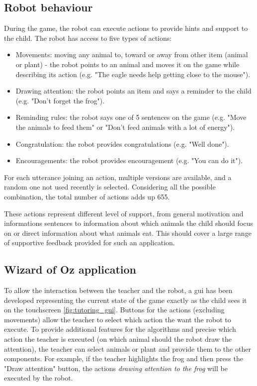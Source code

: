 \subsection{Robot behaviour}
 
During the game, the robot can execute actions to provide hints and support to the child. The robot has access to five types of actions:
\begin{itemize}
	\item Movements: moving any animal to, toward or away from other item (animal or plant) - the robot points to an animal and moves it on the game while describing its action (e.g. "The eagle needs help getting close to the mouse").
	\item Drawing attention: the robot points an item and says a reminder to the child (e.g. "Don't forget the frog").
	\item Reminding rules: the robot says one of 5 sentences on the game (e.g. "Move the animals to feed them" or "Don't feed animals with a lot of energy").
	\item Congratulation: the robot provides congratulations (e.g. "Well done").
	\item Encouragements: the robot provides encouragement (e.g. "You can do it").
\end{itemize}

For each utterance joining an action, multiple versions are available, and a random one not used recently is selected. Considering all the possible combination, the total number of  actions adds up 655.

These actions represent different level of support, from general motivation and informations sentences to information about which animals the child should focus on or direct information about what animals eat. This should cover a large range of supportive feedback provided for such an application. 

\subsection{Wizard of Oz application}

To allow the interaction between the teacher and the robot, a \gls{gui} has been developed representing the current state of the game exactly as the child sees it on the touchscreen \ref{fig:tutoring_gui}. Buttons for the actions (excluding movements) allow the teacher to select which action the want the robot to execute. To provide additional features for the algorithms and precise which action the teacher is executed (on which animal should the robot draw the attention), the teacher can select animals or plant and provide them to the other components. For example, if the teacher highlights the frog and then press the "Draw attention" button, the actions \textit{drawing attention to the frog} will be executed by the robot.

